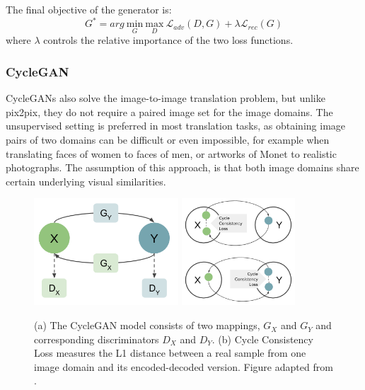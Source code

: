 \documentclass{article}
\begin{document}
The final objective of the generator is:
\begin{equation}
G^{*} = arg \ \underset{G}{\mathrm{min}} \ \underset{D}{\mathrm{max}} \ \mathcal{L}_{adv}(D,G) + \lambda \mathcal{L}_{rec}(G)
\end{equation}
where $\lambda$ controls the relative importance of the two loss functions.


\subsubsection{CycleGAN}
CycleGANs \cite{zhu_unpaired_2017} also solve the image-to-image translation problem, but unlike pix2pix, they do not require a paired image set for the image domains. The unsupervised setting is preferred in most translation tasks, as obtaining image pairs of two domains can be difficult or even impossible, for example when translating faces of women to faces of men, or artworks of Monet to realistic photographs. The assumption of this approach, is that both image domains share certain underlying visual similarities.

\begin{figure}[t]
\centering
{}
{\includegraphics[height=4cm]{CycleGAN_graph}}\hspace{1cm}
{\includegraphics[height=4cm]{CycleGAN_graph2}}
\caption{\label{fig:cyclegan} (a) The CycleGAN model consists of two mappings, $G_{X}$ and $G_{Y}$ and corresponding discriminators $D_{X}$ and $D_{Y}$. (b) Cycle Consistency Loss measures the L1 distance between a real sample from one image domain and its encoded-decoded version. Figure adapted from \cite{zhu_unpaired_2017}.}
\end{figure}
\end{document}
